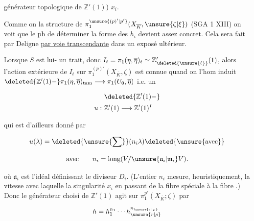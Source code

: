 générateur topologique de $\mathbb Z'(1)$)   $x_i$.

 Comme on  la structure de $\pi_1^{\unsure{(p)'|p'}}(X_{\overline K},\unsure{\zeta|\xi})$  (SGA 1 XIII)  on voit que le pb de déterminer la forme des $h_i$ devient assez concret. Cela  sera fait par Deligne \uline{par voie transcendante} dans un exposé ultérieur.

Lorsque $S$ est lui-\unsure{$=$} un trait, donc  $I_t=\pi_1(\eta,\overline\eta)_t\simeq\mathbb Z'_{\deleted{\unsure{\ell}}}(1)$, alors l'action extérieure de $I_t$ sur $\pi_1^{(p)'}(X_{\overline K},\zeta)$ est connue quand on  l'hom induit $\deleted{\mathbb Z'(1)\mathbin{-}}\pi_1(\eta,\overline\eta)_{\mathrm{tam}}\longrightarrow\pi_1(U_0,\overline\eta)$ i.e. un 

\[
\begin{aligned}
&\deleted{\mathbb Z'(1)\mathbin{-}}\\
u:\ &\mathbb Z'(1)\longrightarrow\mathbb Z'(1)^I
\end{aligned}
\]

 qui est d'ailleurs donné par

\[
u(\lambda)=\deleted{\unsure{\sum}}(n_i\lambda)\deleted{\unsure{\text{avec}}}
\]

\[
\text{avec}\qquad n_i=\operatorname{long}(V/\unsure{\mathfrak a_i|\mathfrak m_i}V).
\]

où $\mathfrak a_i$ est l'idéal définissant le diviseur $D_i$. (L'entier $n_i$ mesure,  heuristiquement, la vitesse avec laquelle  la singularité $x_i$ en passant de la fibre spéciale à la fibre .) Donc le générateur choisi de $\mathbb Z'(1)$ agit  sur $\pi_1^{p'}(X_{\overline K};\zeta)$ par

\[
h=h_1^{n_1}\cdots h_{\unsure{r|\rho}}^{n_{\unsure{r|\rho}}}
\]

